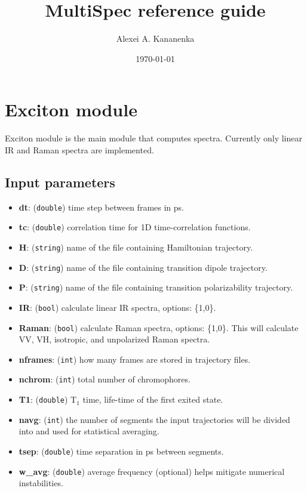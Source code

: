 \documentclass{article}
\begin{document}
\title{MultiSpec reference guide}
\author{Alexei A. Kananenka}
\date{\today}
\maketitle
\tableofcontents

\section{Exciton module}
Exciton module is the main module that computes spectra. Currently only linear IR and Raman spectra are implemented.

\subsection{Input parameters}

\begin{itemize}
\item \textbf{dt}: (\texttt{double}) time step between frames in ps.
\item \textbf{tc}: (\texttt{double}) correlation time for 1D time-correlation functions.
\item \textbf{H}: (\texttt{string}) name of the file containing Hamiltonian trajectory. 
\item \textbf{D}: (\texttt{string}) name of the file containing transition dipole trajectory. 
\item \textbf{P}: (\texttt{string}) name of the file containing transition polarizability trajectory. 
\item \textbf{IR}: (\texttt{bool}) calculate linear IR spectra, options: \{1,0\}.
\item \textbf{Raman}: (\texttt{bool}) calculate Raman spectra, options: \{1,0\}. This will calculate VV, VH, isotropic, and unpolarized Raman spectra.
\item \textbf{nframes}: (\texttt{int}) how many frames are stored in trajectory files.
\item \textbf{nchrom}: (\texttt{int}) total number of chromophores.
\item \textbf{T1}: (\texttt{double}) T$_1$ time, life-time of the first exited state.
\item \textbf{navg}: (\texttt{int}) the number of segments the input trajectories will be divided into and used for statistical averaging.
\item \textbf{tsep}: (\texttt{double}) time separation in ps between segments.
\item \textbf{w\_avg}: (\texttt{double}) average frequency (optional) helps mitigate numerical instabilities.

\end{itemize}
\end{document}
